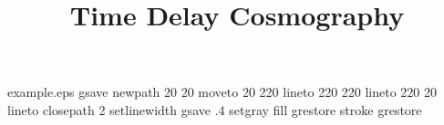 %
\begin{filecontents*}{example.eps}
gsave
newpath
  20 20 moveto
  20 220 lineto
  220 220 lineto
  220 20 lineto
closepath
2 setlinewidth
gsave
  .4 setgray fill
grestore
stroke
grestore
\end{filecontents*}
%
\RequirePackage{fix-cm}
%
\documentclass[smallextended]{svjour3}       %
%
\smartqed  %
%
%
%
\usepackage{graphicx}
\usepackage[round]{natbib}
\usepackage{amssymb,amsmath}
%
\newcommand{\mnras}{MNRAS}
\newcommand{\nat}{Nature}
\newcommand{\aap}{A\&A}
\newcommand{\apj}{ApJ}
\newcommand{\aj}{AJ}
\newcommand{\apjl}{ApJL}
\newcommand{\apjs}{ApJS}
\newcommand{\jcap}{JCAP}
\newcommand{\physrep}{Phys.Rep.}
\newcommand{\prd}{Phys.Rev.D}
\newcommand{\araa}{ARA\&A}
\newcommand{\Ddt}{D_{\Delta{\rm t}}}
\newcommand{\Dd}{D_{\rm d}}
\newcommand{\Ds}{D_{\rm s}}
\newcommand{\Dds}{D_{\rm ds}}
\newcommand{\zd}{z_{\rm d}}
\newcommand{\zs}{z_{\rm s}}
\newcommand{\cospars}{\boldsymbol{\Omega}}
\newcommand{\Ok}{\Omega_{\rm k}}
\newcommand{\ODE}{\Omega_{\rm DE}}
\newcommand{\wDE}{w_0}
\newcommand{\x}{\boldsymbol{\theta}}
\newcommand{\y}{\boldsymbol{\beta}}
\newcommand{\grad}{\boldsymbol{\nabla}}
\newcommand{\deflectionangle}{\boldsymbol{\alpha}}
%
%



\title{Time Delay Cosmography%
}


